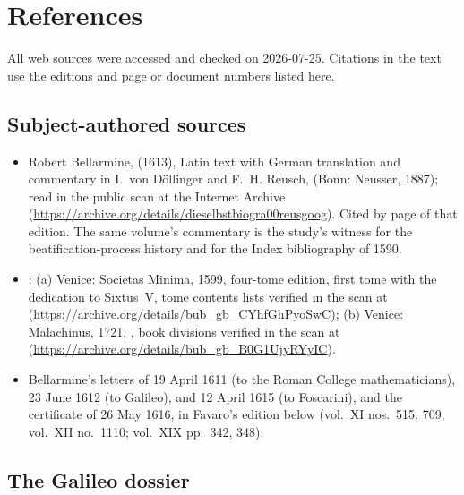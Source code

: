 \section{References}

\begingroup
\raggedright

All web sources were accessed and checked on 2026-07-25. Citations
in the text use the editions and page or document numbers listed
here.

\subsection*{Subject-authored sources}

\begin{itemize}
\item Robert Bellarmine,  (1613), Latin text with German translation
and commentary in I.~von D\"ollinger and F.~H. Reusch,  (Bonn: Neusser, 1887);
read in the public scan at the Internet Archive
(\url{https://archive.org/details/dieselbstbiogra00reusgoog}).
Cited by page of that edition. The same volume's commentary is the
study's witness for the beatification-process history and for the
Index bibliography of 1590.
\item {}: (a) Venice: Societas Minima, 1599, four-tome
edition, first tome with the dedication to Sixtus~V, tome
contents lists verified in the scan at
(\url{https://archive.org/details/bub_gb_CYhfGhPyoSwC});
(b) Venice: Malachinus, 1721, , book divisions verified in the scan
at (\url{https://archive.org/details/bub_gb_B0G1UjyRYyIC}).
\item Bellarmine's letters of 19 April 1611 (to the Roman College
mathematicians), 23 June 1612 (to Galileo), and 12 April 1615 (to
Foscarini), and the certificate of 26 May 1616, in Favaro's
edition below (vol.~XI nos.~515, 709; vol.~XII no.~1110; vol.~XIX
pp.~342, 348).
\end{itemize}

\subsection*{The Galileo dossier}

